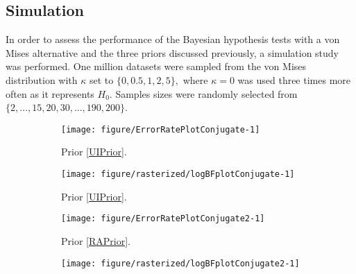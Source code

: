 \subsection{Simulation}
\label{ssub:Simulation}

In order to assess the performance of the Bayesian hypothesis tests with a von Mises alternative and the three priors discussed previously, a simulation study was performed.  One million datasets were sampled from the von Mises distribution with \( \kappa \) set to  \( \{ 0, 0.5, 1, 2, 5 \}, \) where \( \kappa = 0 \) was used three times more often as it represents \( H_0.\) Samples sizes were randomly selected from \( \{ 2, \dots, 15, 20, 30, \dots, 190, 200 \} \).



\begin{figure}
  \begin{subfigure}[t]{0.5\linewidth}
    \centering
\begin{knitrout}
\color{fgcolor}
\texttt{[image: figure/ErrorRatePlotConjugate-1]} 

\end{knitrout}
    \caption{Prior \ref{UIPrior}.}\label{fig:ErrorRatePlotConjugate}
  \end{subfigure}%
  \begin{subfigure}[t]{0.5\linewidth}
   \centering
\begin{knitrout}
\color{fgcolor}
\texttt{[image: figure/rasterized/logBFplotConjugate-1]} 

\end{knitrout}
    \caption{Prior \ref{UIPrior}.}\label{fig:logBFplotConjugate}
  \end{subfigure}
  \begin{subfigure}[t]{0.5\linewidth}
    \centering
\begin{knitrout}
\color{fgcolor}
\texttt{[image: figure/ErrorRatePlotConjugate2-1]} 

\end{knitrout}
   \caption{Prior \ref{RAPrior}.}\label{fig:ErrorRatePlotConjugate2}
  \end{subfigure}%
  \begin{subfigure}[t]{0.5\linewidth}
   \centering
\begin{knitrout}
\color{fgcolor}
\texttt{[image: figure/rasterized/logBFplotConjugate2-1]} 


\end{knitrout}
\end{subfigure}
\end{figure}
